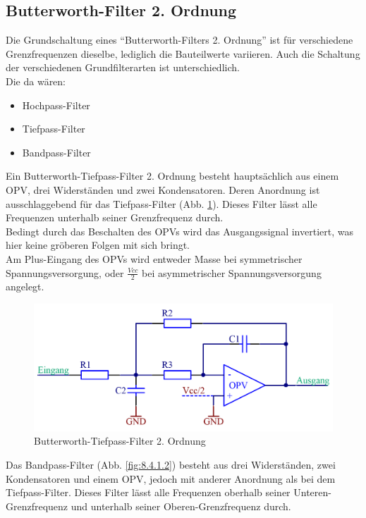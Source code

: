 \subsection{Butterworth-Filter 2. Ordnung}\label{subsec:8.4.1}
Die Grundschaltung eines \enquote{Butterworth-Filters 2. Ordnung} ist für verschiedene Grenzfrequenzen dieselbe, lediglich die Bauteilwerte variieren.
Auch die Schaltung der verschiedenen Grundfilterarten ist unterschiedlich. \\
Die da wären: 
\begin{itemize}
	\item Hochpass-Filter
	\item Tiefpass-Filter
	\item Bandpass-Filter
\end{itemize}
Ein Butterworth-Tiefpass-Filter 2. Ordnung besteht hauptsächlich aus einem OPV, drei Widerständen und zwei Kondensatoren.
Deren Anordnung ist ausschlaggebend für das Tiefpass-Filter (Abb. \ref{fig:8.4.1.1}).
Dieses Filter lässt alle Frequenzen unterhalb seiner Grenzfrequenz durch.\\ 
Bedingt durch das Beschalten des OPVs wird das Ausgangssignal invertiert, was hier keine gröberen Folgen mit sich bringt.\\ 
Am Plus-Eingang des OPVs wird entweder Masse bei symmetrischer Spannungsversorgung, oder $\frac{Vcc}{2}$ bei asymmetrischer Spannungsversorgung angelegt.
\begin{figure} [H]
	\centering
	\includegraphics[width=1\textwidth]{img/Print3/TPFilterButterworth2Ordnung.PNG}
	\caption{Butterworth-Tiefpass-Filter 2. Ordnung}
	\label {fig:8.4.1.1}
\end{figure}
Das Bandpass-Filter (Abb. \ref{fig:8.4.1.2}) besteht aus drei Widerständen, zwei Kondensatoren und einem OPV, jedoch mit anderer Anordnung als bei dem Tiefpass-Filter.
Dieses Filter lässt alle Frequenzen oberhalb seiner Unteren-Grenzfrequenz und unterhalb seiner Oberen-Grenzfrequenz durch.
